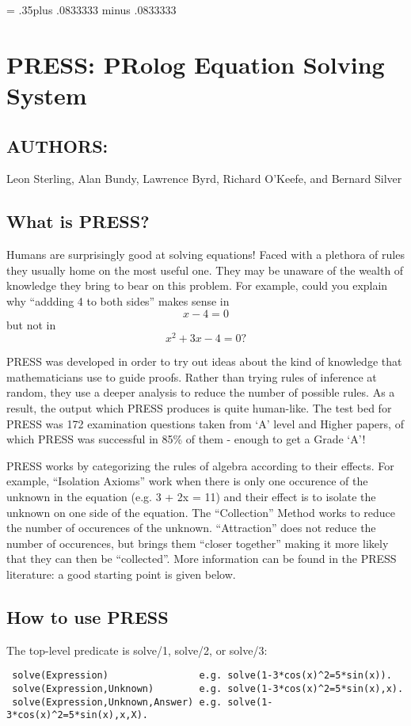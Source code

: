 \def\id#1{\hbox{\it#1}}
\parindent=0pt
\parskip= .35\baselineskip plus .0833333\baselineskip 
                          minus .0833333\baselineskip
\pagestyle{empty}


\section*{ PRESS: PRolog Equation Solving System}

\subsection*{AUTHORS:}
 Leon Sterling, Alan Bundy, Lawrence Byrd, Richard O'Keefe, and
	 Bernard Silver

\subsection*{What is PRESS? }

Humans are surprisingly good at solving equations! Faced with a plethora
of rules they usually home on the most useful one. They may
be unaware of the wealth of knowledge they bring to bear on this
problem. For example, could you explain why ``addding 4 to both sides''
makes sense in
\[ x - 4 = 0 \]
but not in
\[ x^2 +3x - 4 = 0? \]

PRESS was developed in order to try out ideas about
the kind of knowledge that mathematicians use to guide proofs. Rather
than trying rules of inference at random, they use a deeper analysis
to reduce the number of possible rules. As a result, the output which
PRESS produces is quite human-like. The test bed for PRESS was 172
examination questions taken from `A' level and Higher papers, of which
PRESS was successful in 85\% of them - enough to get a Grade `A'!

PRESS works by categorizing the rules of algebra according to their
effects. For example, ``Isolation Axioms'' work when there is only
one occurence of the unknown in the equation (e.g. 3 + 2x = 11)
and their effect is to isolate the unknown on one side of the equation.
The ``Collection'' Method works to reduce the number of occurences
of the unknown. ``Attraction'' does not reduce the number of occurences,
but brings them ``closer together'' making it more likely that they
can then be ``collected''. More information can be found in the PRESS
literature: a good starting point is given below.
\subsection*{How to use PRESS }
The top-level predicate is solve/1, solve/2, or solve/3:
\begin{verbatim} 
 solve(Expression)                e.g. solve(1-3*cos(x)^2=5*sin(x)).
 solve(Expression,Unknown)        e.g. solve(1-3*cos(x)^2=5*sin(x),x).
 solve(Expression,Unknown,Answer) e.g. solve(1-3*cos(x)^2=5*sin(x),x,X).
\end{verbatim}

